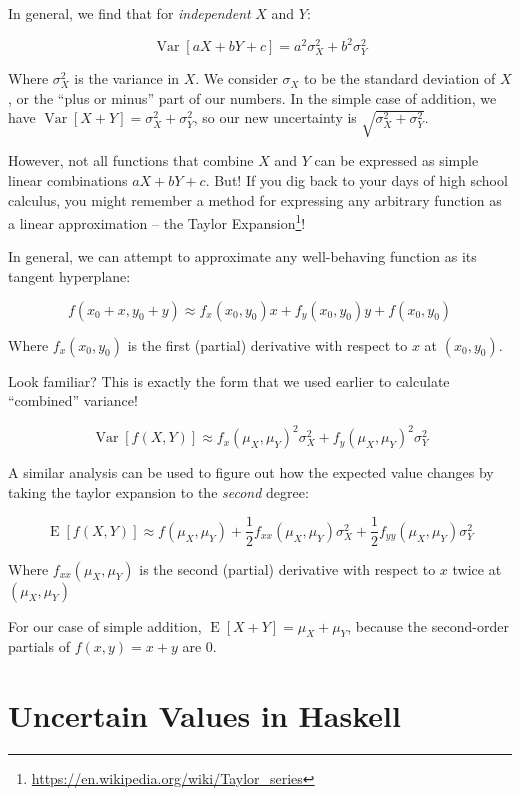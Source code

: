 \documentclass[]{article}
\renewcommand{\href}[2]{#2\footnote{\url{#1}}}
\begin{document}
In general, we find that for \emph{independent} \(X\) and \(Y\):

\[\operatorname{Var}[aX + bY + c] = a^2 \sigma_X^2 + b^2 \sigma_Y^2\]

Where \(\sigma_X^2\) is the variance in \(X\). We consider \(\sigma_X\)
to be the standard deviation of \(X\), or the ``plus or minus'' part of
our numbers. In the simple case of addition, we have
\(\operatorname{Var}[X + Y] = \sigma_X^2 + \sigma_Y^2\), so our new
uncertainty is \(\sqrt{\sigma_X^2 + \sigma_Y^2}\).

However, not all functions that combine \(X\) and \(Y\) can be expressed
as simple linear combinations \(aX + bY + c\). But! If you dig back to
your days of high school calculus, you might remember a method for
expressing any arbitrary function as a linear approximation -- the
\href{https://en.wikipedia.org/wiki/Taylor_series}{Taylor Expansion}!

In general, we can attempt to approximate any well-behaving function as
its tangent hyperplane:

\[f(x_0 + x, y_0 + y) \approx f_x(x_0, y_0) x + f_y(x_0, y_0) y + f(x_0, y_0)\]

Where \(f_x(x_0,y_0)\) is the first (partial) derivative with respect to
\(x\) at \((x_0, y_0)\).

Look familiar? This is exactly the form that we used earlier to
calculate ``combined'' variance!

\[\operatorname{Var}[f(X,Y)] \approx f_x(\mu_X, \mu_Y)^2 \sigma_X^2 + f_y(\mu_X,\mu_Y)^2 \sigma_Y^2\]

A similar analysis can be used to figure out how the expected value
changes by taking the taylor expansion to the \emph{second} degree:

\[\operatorname{E}[f(X,Y)] \approx
f(\mu_X, \mu_Y) +
\frac{1}{2} f_{xx}(\mu_X, \mu_Y) \sigma_X^2 +
\frac{1}{2} f_{yy}(\mu_X, \mu_Y) \sigma_Y^2
\]

Where \(f_{xx}(\mu_X, \mu_Y)\) is the second (partial) derivative with
respect to \(x\) twice at \((\mu_X, \mu_Y)\)

For our case of simple addition,
\(\operatorname{E}[X + Y] = \mu_X + \mu_Y\), because the second-order
partials of \(f(x,y) = x + y\) are 0.

\section{Uncertain Values in Haskell}\label{uncertain-values-in-haskell}
\end{document}

